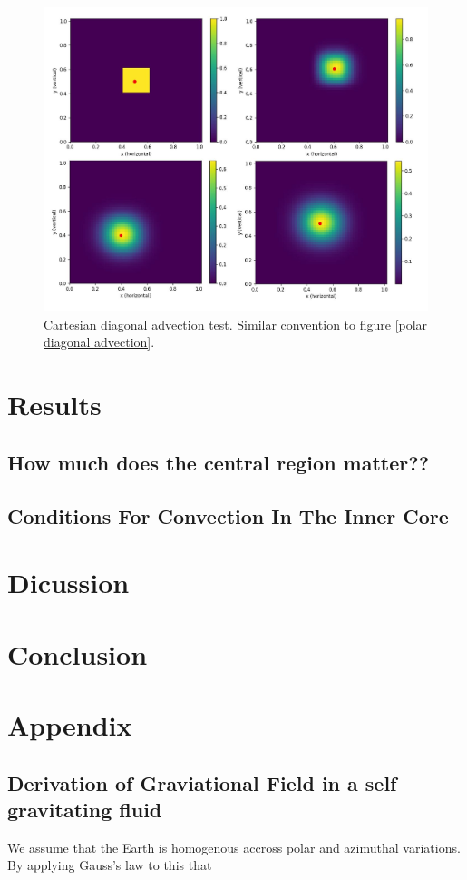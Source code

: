 \documentclass{article}
\begin{document}
\begin{figure}[h!]
	\centering 
	\includegraphics{cartesianDiagonal/CartesianDiagonalFigure.jpg}
	\caption{Cartesian diagonal advection test. Similar convention to figure \ref{polar diagonal advection}. }
	\label{cartesian diagonal advection}
\end{figure}

\section*{Results}

\subsection*{How much does the central region matter??}


\subsection*{Conditions For Convection In The Inner Core}



\section*{Dicussion}


\section*{Conclusion}


\section*{Appendix}

\subsection*{Derivation of Graviational Field in a self gravitating fluid}
We assume that the Earth is homogenous accross polar and azimuthal variations. By applying Gauss's law to this that 




\end{document}
